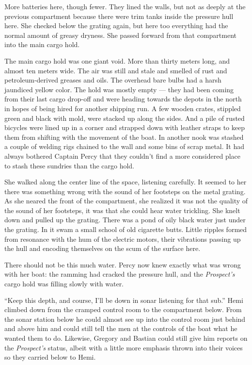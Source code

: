 \documentclass[]{scrbook}
\begin{document}
More batteries here, though fewer. They lined the walls, but not as
deeply at the previous compartment because there were trim tanks inside
the pressure hull here. She checked below the grating again, but here
too everything had the normal amount of greasy dryness. She passed
forward from that compartment into the main cargo hold.

The main cargo hold was one giant void. More than thirty meters long,
and almost ten meters wide. The air was still and stale and smelled of
rust and petroleum-derived greases and oils. The overhead bare bulbs had
a harsh jaundiced yellow color. The hold was mostly empty --- they had
been coming from their last cargo drop-off and were heading towards the
depots in the north in hopes of being hired for another shipping run. A
few wooden crates, stippled green and black with mold, were stacked up
along the sides. And a pile of rusted bicycles were lined up in a corner
and strapped down with leather straps to keep them from shifting with
the movement of the boat. In another nook was stashed a couple of
welding rigs chained to the wall and some bins of scrap metal. It had
always bothered Captain Percy that they couldn't find a more considered
place to stash these sundries than the cargo hold.

She walked along the center line of the space, listening carefully. It
seemed to her there was something wrong with the sound of her footsteps
on the metal grating. As she neared the front of the compartment, she
realized it was not the quality of the sound of her footsteps, it was
that she could hear water trickling. She knelt down and pulled up the
grating. There was a pond of oily black water just under the grating. In
it swam a small school of old cigarette butts. Little ripples formed
from resonance with the hum of the electric motors, their vibrations
passing up the hull and encoding themselves on the scum of the surface
here.

There should not be this much water. Percy now knew exactly what was
wrong with her boat: the ramming had cracked the pressure hull, and the
\emph{Prospect's} cargo hold was filling slowly with water.

``Keep this depth, and course, I'll be down in sonar listening for that
sub.'' Hemi climbed down from the cramped control room to the
compartment below. From the sonar station below he could almost see up
into the control room just behind and above him and could still tell the
men at the controls of the boat what he wanted them to do. Likewise,
Gregory and Bastian could still give him reports on the
\emph{Prospect's} status, albeit with a little more emphasis thrown into
their voices so they carried below to Hemi.
\end{document}
